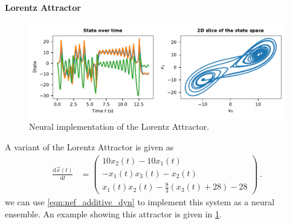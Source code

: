 \documentclass[10pt,letterpaper,oneside]{article}
\begin{document}
\paragraph{Lorentz Attractor}

\begin{figure}[t]
	\centering
	\includegraphics{media/example_lorentz.pdf}
	\caption{Neural implementation of the Lorentz Attractor. }
	\label{fig:example_lorentz}
\end{figure}

A variant of the Lorentz Attractor is given as
\begin{align*}
	\frac{\mathrm{d}\vec x(t)}{\mathrm{d}t} &= \begin{pmatrix}
		10 x_2(t)-10x_1(t) \\
		-x_1(t) x_3(t)-x_2(t) \\
		 x_1(t) x_2(t) - \frac{8}{3}(x_3(t)+28)-28
	\end{pmatrix} \,.
\end{align*}
we can use \cref{eqn:nef_additive_dyn} to implement this system as a neural ensemble. An example showing this attractor is given in \cref{fig:example_lorentz}.

%
%
%
%
\end{document}
